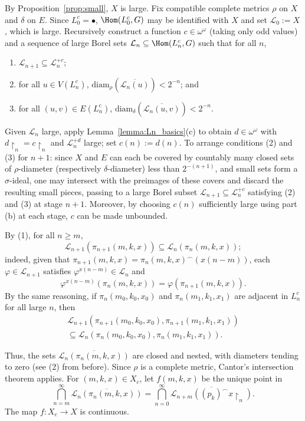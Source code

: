 \documentclass[12pt]{article}
\begin{document}
By Proposition~\ref{prop:small}, $X$ is large.
Fix compatible complete metrics $\rho$ on $X$ and $\delta$ on $E$.
Since $L^c_0=\bullet$, $\Hom(L^c_0,G)$ may be identified with $X$ and set $\mathcal L_0:=X$, which is large.
Recursively construct a function $c\in\omega^\omega$ (taking only odd values) and a sequence of large Borel sets $\mathcal L_n\subseteq\Hom(L^c_n, G)$ such that for all $n$,

\begin{enumerate}[label=(\arabic*)]
    \item $\mathcal L_{n+1}\subseteq\mathcal L_n^{+c}$;
    \item for all $u\in V(L^c_n)$, $\mathrm{diam}_\rho(\overline{\mathcal L_n(u)})< 2^{-n}$; and
    \item for all $(u,v)\in E(L^c_n)$, $\mathrm{diam}_\delta(\overline{\mathcal L_n(u,v)})< 2^{-n}$.
\end{enumerate}

Given $\mathcal L_n$ large, apply Lemma~\ref{lemma:Ln_basics}(c) to obtain $d\in\omega^\omega$ with $d\restriction_n=c\restriction_n$ and $\mathcal L_n^{+d}$ large; set $c(n):=d(n)$.
To arrange conditions (2) and (3) for $n+1$: since $X$ and $E$ can each be covered by countably many closed sets of $\rho$-diameter (respectively $\delta$-diameter) less than $2^{-(n+1)}$, and small sets form a $\sigma$-ideal, one may intersect with the preimages of these covers and discard the resulting small pieces, passing to a large Borel subset $\mathcal L_{n+1}\subseteq\mathcal L_n^{+c}$ satisfying (2) and (3) at stage $n+1$.
Moreover, by choosing $c(n)$ sufficiently large using part (b) at each stage, $c$ can be made unbounded.

By (1), for all $n\geq m$, $$\mathcal L_{n+1}(\pi_{n+1}(m,k,x))\subseteq\mathcal L_n(\pi_n(m,k,x));$$ indeed, given that $\pi_{n+1}(m,k,x)=\pi_n(m,k,x)^\frown(x(n-m))$, each $\varphi\in\mathcal L_{n+1}$ satisfies $\varphi^{x(n-m)}\in\mathcal L_n$ and $$\varphi^{x(n-m)}(\pi_n(m,k,x))=\varphi(\pi_{n+1}(m,k,x)).$$
By the same reasoning, if $\pi_n(m_0,k_0,x_0)$ and $\pi_n(m_1,k_1,x_1)$ are adjacent in $L^c_n$ for all large $n$, then \begin{align*}
    \mathcal L_{n+1}(\pi_{n+1}(m_0,k_0,x_0),\pi_{n+1}(m_1,k_1,x_1))\\
    \subseteq\mathcal L_n(\pi_n(m_0,k_0,x_0),\pi_n(m_1,k_1,x_1)).
\end{align*}

Thus, the sets $\overline{\mathcal L_n(\pi_n(m,k,x))}$ are closed and nested, with diameters tending to zero (see (2) from before).
Since $\rho$ is a complete metric, Cantor's intersection theorem applies.
For $(m,k,x)\in X_c$, let $f(m,k,x)$ be the unique point in $$\bigcap_{n=m}^\infty\overline{\mathcal L_n(\pi_n(m,k,x))}=\bigcap_{n=0}^\infty\overline{\mathcal L_{n+m}((p_k)^\frown x\restriction_n)}.$$
The map $f\colon X_c\to X$ is continuous.
\end{document}
